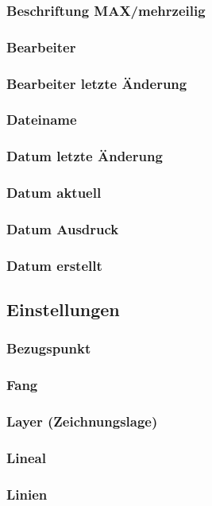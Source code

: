 \documentclass[a4paper]{book}
\begin{document}
			\subsubsection{Beschriftung MAX/mehrzeilig}
			\subsubsection{Bearbeiter} 
			\subsubsection{Bearbeiter letzte Änderung} 
			\subsubsection{Dateiname} 
			\subsubsection{Datum letzte Änderung} 
			\subsubsection{Datum aktuell} 
			\subsubsection{Datum Ausdruck}
			\subsubsection{Datum erstellt} 
		\subsection{Einstellungen}
			\subsubsection{Bezugspunkt} 
			\subsubsection{Fang} 
			\subsubsection{Layer (Zeichnungslage)} 
			\subsubsection{Lineal} 
			\subsubsection{Linien} 
\end{document}

